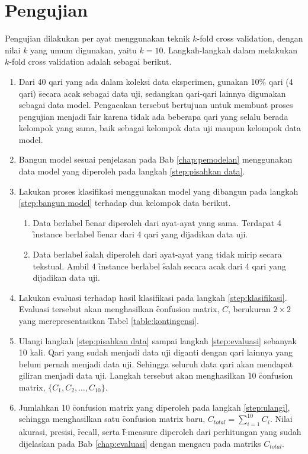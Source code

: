 \section{Pengujian}
Pengujian dilakukan per ayat menggunakan teknik \f{$k$-fold cross validation}, dengan nilai $k$ yang umum digunakan, yaitu $k = 10$. Langkah-langkah dalam melakukan \f{$k$-fold cross validation} adalah sebagai berikut.
\begin{enumerate}
  \item \label{step:pisahkan data} Dari 40 qari yang ada dalam koleksi data eksperimen, gunakan 10\% qari (4 qari) \f{secara acak} sebagai data uji, sedangkan qari-qari lainnya digunakan sebagai data model. Pengacakan tersebut bertujuan untuk membuat proses pengujian menjadi \f{fair} karena tidak ada beberapa qari yang selalu berada kelompok yang sama, baik sebagai kelompok data uji maupun kelompok data model.

  \item \label{step:bangun model} Bangun model sesuai penjelasan pada Bab \ref{chap:pemodelan} menggunakan data model yang diperoleh pada langkah \ref{step:pisahkan data}.

  \item \label{step:klasifikasi} Lakukan proses klasifikasi menggunakan model yang dibangun pada langkah \ref{step:bangun model} terhadap dua kelompok data berikut.
  \begin{enumerate}
    \item Data berlabel \f{benar} diperoleh dari ayat-ayat yang sama. Terdapat 4 \f{instance} berlabel \f{benar} dari 4 qari yang dijadikan data uji.
    \item Data berlabel \f{salah} diperoleh dari ayat-ayat yang tidak mirip secara tekstual. Ambil 4 \f{instance} berlabel \f{salah} secara acak dari 4 qari yang dijadikan data uji.
  \end{enumerate}

  \item \label{step:evaluasi} Lakukan evaluasi terhadap hasil klasifikasi pada langkah \ref{step:klasifikasi}. Evaluasi tersebut akan menghasilkan \f{confusion matrix}, $C$, berukuran $2\times2$ yang merepresentasikan Tabel \ref{table:kontingensi}.

  \item \label{step:ulangi} Ulangi langkah \ref{step:pisahkan data} sampai langkah \ref{step:evaluasi} sebanyak 10 kali. Qari yang sudah menjadi data uji diganti dengan qari lainnya yang belum pernah menjadi data uji. Sehingga seluruh data qari akan mendapat giliran menjadi data uji. Langkah tersebut akan menghasilkan 10 \f{confusion matrix}, $\{C_1, C_2, \dots, C_{10}\}$.

  \item Jumlahkan 10 \f{confusion matrix} yang diperoleh pada langkah \ref{step:ulangi}, sehingga menghasilkan satu \f{confusion matrix} baru, $C_{total} = \sum_{i=1}^{10}{C_i}$. Nilai akurasi, presisi, \f{recall}, serta \f{f-measure} diperoleh dari perhitungan yang sudah dijelaskan pada Bab \ref{chap:evaluasi} dengan mengacu pada matriks $C_{total}$.
\end{enumerate}
